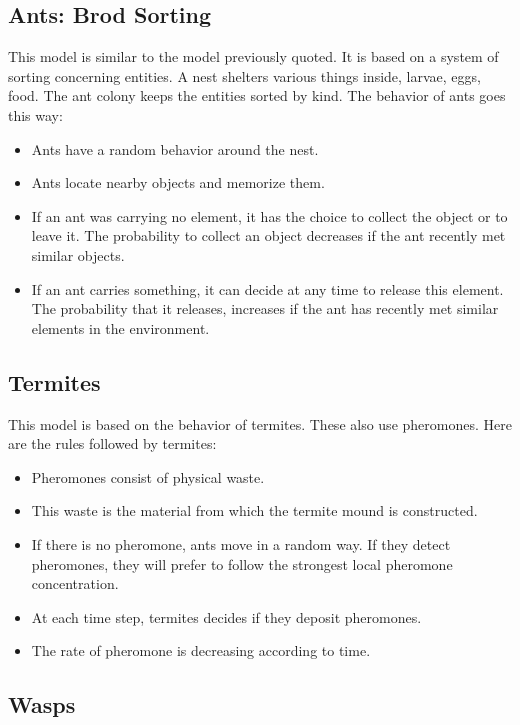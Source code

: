 \newpage

\subsection{Ants: Brod Sorting}

This model is similar to the model previously quoted. It is based on a system of sorting concerning entities. A nest shelters various things inside, larvae, eggs, food. The ant colony keeps the entities sorted by kind.
The behavior of ants goes this way:

\begin{itemize}
\item Ants have a random behavior around the nest.
\item Ants locate nearby objects and memorize them.
\item If an ant was carrying no element, it has the choice to collect the object or to leave it. The probability to collect an object decreases if the ant recently met similar objects.
\item If an ant carries something, it can decide at any time to release this element. The probability that it releases, increases if the ant has recently met similar elements in the environment.
\end{itemize}

\subsection{Termites}

This model is based on the behavior of termites. These also use pheromones. Here are the rules followed by termites:

\begin{itemize}
\item Pheromones consist of physical waste.
\item This waste is the material from which the termite mound is constructed.
\item If there is no pheromone, ants move in a random way. If they detect pheromones, they will prefer to follow the strongest local pheromone concentration.
\item At each time step, termites decides if they deposit pheromones.
\item The rate of pheromone is decreasing according to time.
\end{itemize} 

\subsection{Wasps}

